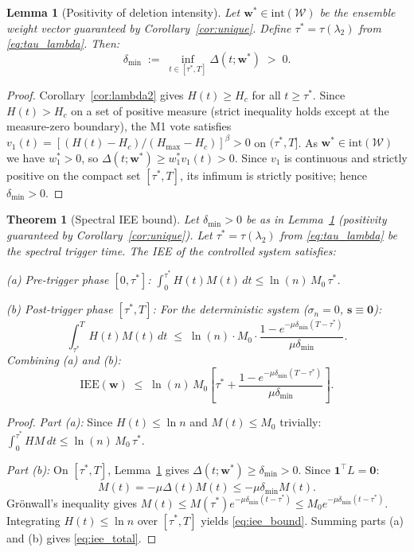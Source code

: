 \documentclass[review,12pt]{elsarticle}
\newcommand{\bfw}{\mathbf{w}}
\newcommand{\IEE}{\mathrm{IEE}}
\newcommand{\Hc}{H_c}
\newcommand{\Hmax}{H_{\max}}
\newcommand{\lambdat}{\lambda_2}
\newtheorem{theorem}{Theorem}
\newtheorem{lemma}{Lemma}
\begin{document}
\begin{lemma}[Positivity of deletion intensity]
\label{lem:delta_pos}
Let $\bfw^* \in \mathrm{int}(\mathcal{W})$ be the ensemble weight vector
guaranteed by Corollary~\ref{cor:unique}.  Define
$\tau^* = \tau(\lambdat)$ from \eqref{eq:tau_lambda}.  Then:
\begin{equation}
  \delta_{\min} \;:=\; \inf_{t \in [\tau^*, T]} \Delta(t;\bfw^*) \;>\; 0.
  \label{eq:delta_min}
\end{equation}
\end{lemma}

\begin{proof}
Corollary~\ref{cor:lambda2} gives $H(t) \geq \Hc$ for all $t \geq \tau^*$.
Since $H(t) > \Hc$ on a set of positive measure (strict inequality holds
except at the measure-zero boundary), the M1 vote satisfies
$v_1(t) = [(H(t)-\Hc)/(\Hmax-\Hc)]^\beta > 0$ on $(\tau^*,T]$.
As $\bfw^* \in \mathrm{int}(\mathcal{W})$ we have $w_1^* > 0$, so
$\Delta(t;\bfw^*) \geq w_1^* v_1(t) > 0$.
Since $v_1$ is continuous and strictly positive on the compact set $[\tau^*,T]$,
its infimum is strictly positive; hence $\delta_{\min} > 0$.
\end{proof}

\begin{theorem}[Spectral IEE bound]
\label{thm:iee_bound}
Let $\delta_{\min} > 0$ be as in Lemma~\ref{lem:delta_pos}
(positivity guaranteed by Corollary~\ref{cor:unique}).
Let $\tau^* = \tau(\lambdat)$ from \eqref{eq:tau_lambda} be the spectral
trigger time.  The IEE of the controlled system satisfies:
\medskip

\noindent\emph{(a) Pre-trigger phase $[0, \tau^*]$:}
$\displaystyle\int_0^{\tau^*} H(t)M(t)\,dt \leq \ln(n)\,M_0\,\tau^*$.

\noindent\emph{(b) Post-trigger phase $[\tau^*, T]$:} For the deterministic
system ($\sigma_n=0$, $\mathbf{s}\equiv\mathbf{0}$):
\begin{equation}
  \int_{\tau^*}^T H(t)M(t)\,dt \;\leq\;
  \ln(n)\cdot M_0 \cdot
  \frac{1 - e^{-\mu\delta_{\min}(T-\tau^*)}}{\mu\delta_{\min}}.
  \label{eq:iee_bound}
\end{equation}
Combining (a) and (b):
\begin{equation}
  \IEE(\bfw) \;\leq\; \ln(n)\,M_0\!\left[
    \tau^* + \frac{1-e^{-\mu\delta_{\min}(T-\tau^*)}}{\mu\delta_{\min}}
  \right].
  \label{eq:iee_total}
\end{equation}
\end{theorem}

\begin{proof}
\emph{Part (a):} Since $H(t) \leq \ln n$ and $M(t) \leq M_0$ trivially:
$\int_0^{\tau^*} H M\,dt \leq \ln(n)\,M_0\,\tau^*$.

\emph{Part (b):} On $[\tau^*,T]$, Lemma~\ref{lem:delta_pos} gives
$\Delta(t;\bfw^*) \geq \delta_{\min} > 0$.
Since $\mathbf{1}^\top L = \mathbf{0}$:
\[
  \dot{M}(t) = -\mu\Delta(t)M(t) \leq -\mu\delta_{\min}M(t).
\]
Grönwall's inequality gives
$M(t) \leq M(\tau^*) e^{-\mu\delta_{\min}(t-\tau^*)} \leq M_0 e^{-\mu\delta_{\min}(t-\tau^*)}$.
Integrating $H(t) \leq \ln n$ over $[\tau^*, T]$ yields \eqref{eq:iee_bound}.
Summing parts (a) and (b) gives \eqref{eq:iee_total}.
\end{proof}
\end{document}
